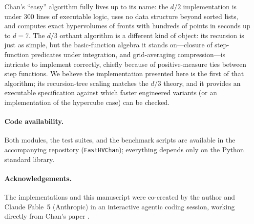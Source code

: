 \documentclass[11pt,a4paper]{article}
\theoremstyle{remark}
\begin{document}
Chan's ``easy'' algorithm fully lives up to its name: the $d/2$
implementation is under 300 lines of executable logic, uses no data structure
beyond sorted lists, and computes exact hypervolumes of fronts with hundreds
of points in seconds up to $d=7$.  The $d/3$ orthant algorithm is a different
kind of object: its recursion is just as simple, but the basic-function
algebra it stands on---closure of step-function predicates under
integration, and grid-averaging compression---is intricate to implement
correctly, chiefly because of positive-measure ties between step functions.
We believe the implementation presented here is the first of that algorithm;
its recursion-tree scaling matches the $d/3$ theory, and it provides an
executable specification against which faster engineered variants (or an
implementation of the hypercube case) can be checked.

\paragraph{Code availability.}
Both modules, the test suites, and the benchmark scripts are available in the
accompanying repository (\texttt{FastHVChan}); everything depends only on the
Python standard library.

\paragraph{Acknowledgements.}
The implementations and this manuscript were co-created by the author and
Claude Fable~5 (Anthropic) in an interactive agentic coding session, working
directly from Chan's paper \cite{Chan2013}.
\end{document}
